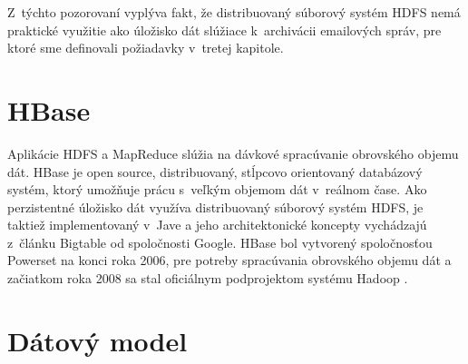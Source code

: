 \documentclass[11pt,twoside,a4paper]{book}
\begin{document}
Z~týchto pozorovaní vyplýva fakt, že distribuovaný súborový systém HDFS nemá praktické využitie ako úložisko dát slúžiace k~archivácii emailových správ, pre ktoré sme definovali požiadavky v~tretej kapitole. %
% 
% 



\section*{HBase}


Aplikácie HDFS a MapReduce slúžia na dávkové spracúvanie obrovského objemu dát. HBase je open source, distribuovaný, stĺpcovo orientovaný databázový systém, ktorý umožňuje prácu s~veľkým objemom dát v~reálnom čase. Ako perzistentné úložisko dát využíva distribuovaný súborový systém HDFS, je taktiež implementovaný v~Jave a jeho architektonické koncepty vychádzajú z~článku Bigtable od spoločnosti Google. HBase bol vytvorený spoločnosťou Powerset na konci roka 2006, pre potreby spracúvania obrovského objemu dát a začiatkom roka 2008 sa stal oficiálnym podprojektom systému Hadoop \cite{White:2009:HDG:1717298}.

\section{Dátový model}
\end{document}
